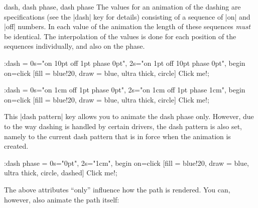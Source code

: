 \begin{tikzanimateattribute}{dash, dash phase, dash phase}
    The values for an animation of the dashing are specifications (see the
    |dash| key for details) consisting of a sequence of |on| and |off| numbers.
    In each value of the animation the length of these sequences \emph{must} be
    identical. The interpolation of the values is done for each position of the
    sequences individually, and also on the phase.
\begin{codeexample}[
    preamble={\usetikzlibrary{animations}},
    animation list={0.5,1,1.5,2},
]
\tikz \node :dash = { 0s="on 10pt off 1pt  phase 0pt",
                      2s="on 1pt  off 10pt phase 0pt", begin on=click}
  [fill = blue!20, draw = blue, ultra thick, circle] {Click me!};
\end{codeexample}
\begin{codeexample}[
    preamble={\usetikzlibrary{animations}},
    animation list={0.5,1,1.5,2},
]
\tikz \node :dash = { 0s="on 1cm off 1pt phase 0pt",
                      2s="on 1cm off 1pt phase 1cm", begin on=click}
  [fill = blue!20, draw = blue, ultra thick, circle] {Click me!};
\end{codeexample}

    This |dash pattern| key allows you to animate the dash phase only. However,
    due to the way dashing is handled by certain drivers, the dash pattern is
    also set, namely to the current dash pattern that is in force when the
    animation is created.
\begin{codeexample}[
    preamble={\usetikzlibrary{animations}},
    animation list={0.5,1,1.5,2},
]
\tikz \node :dash phase = { 0s="0pt", 2s="1cm", begin on=click}
  [fill = blue!20, draw = blue, ultra thick, circle, dashed] {Click me!};
\end{codeexample}
\end{tikzanimateattribute}

The above attributes ``only'' influence how the path is rendered. You can,
however, also animate the path itself:

